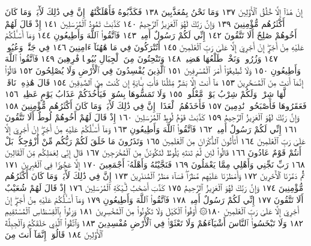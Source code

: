 إِنْ هَٰذَآ إِلَّا خُلُقُ ٱلْأَوَّلِينَ ١٣٧ وَمَا نَحْنُ بِمُعَذَّبِينَ ١٣٨ فَكَذَّبُوهُ
فَأَهْلَكْنَٰهُمْۚ إِنَّ فِي ذَٰلِكَ لَأٓيَةࣰۖ وَمَا كَانَ أَكْثَرُهُم مُّؤْمِنِينَ ١٣٩
وَإِنَّ رَبَّكَ لَهُوَ ٱلْعَزِيزُ ٱلرَّحِيمُ ١٤٠ كَذَّبَتْ ثَمُودُ ٱلْمُرْسَلِينَ ١٤١ إِذْ
قَالَ لَهُمْ أَخُوهُمْ صَٰلِحٌ أَلَا تَتَّقُونَ ١٤٢ إِنِّي لَكُمْ رَسُولٌ أَمِينࣱ ١٤٣
فَٱتَّقُوا۟ ٱللَّهَ وَأَطِيعُونِ ١٤٤ وَمَآ أَسْـَٔلُكُمْ عَلَيْهِ مِنْ أَجْرٍۖ إِنْ أَجْرِيَ
إِلَّا عَلَىٰ رَبِّ ٱلْعَٰلَمِينَ ١٤٥ أَتُتْرَكُونَ فِي مَا هَٰهُنَآ ءَامِنِينَ ١٤٦
فِي جَنَّٰتࣲ وَعُيُونࣲ ١٤٧ وَزُرُوعࣲ وَنَخْلࣲ طَلْعُهَا هَضِيمࣱ ١٤٨
وَتَنْحِتُونَ مِنَ ٱلْجِبَالِ بُيُوتࣰا فَٰرِهِينَ ١٤٩ فَٱتَّقُوا۟ ٱللَّهَ وَأَطِيعُونِ ١٥٠
وَلَا تُطِيعُوٓا۟ أَمْرَ ٱلْمُسْرِفِينَ ١٥١ ٱلَّذِينَ يُفْسِدُونَ فِي ٱلْأَرْضِ
وَلَا يُصْلِحُونَ ١٥٢ قَالُوٓا۟ إِنَّمَآ أَنتَ مِنَ ٱلْمُسَحَّرِينَ ١٥٣ مَآ أَنتَ
إِلَّا بَشَرࣱ مِّثْلُنَا فَأْتِ بِـَٔايَةٍ إِن كُنتَ مِنَ ٱلصَّٰدِقِينَ ١٥٤ قَالَ
هَٰذِهِۦ نَاقَةࣱ لَّهَا شِرْبࣱ وَلَكُمْ شِرْبُ يَوْمࣲ مَّعْلُومࣲ ١٥٥ وَلَا تَمَسُّوهَا
بِسُوٓءࣲ فَيَأْخُذَكُمْ عَذَابُ يَوْمٍ عَظِيمࣲ ١٥٦ فَعَقَرُوهَا فَأَصْبَحُوا۟
نَٰدِمِينَ ١٥٧ فَأَخَذَهُمُ ٱلْعَذَابُۚ إِنَّ فِي ذَٰلِكَ لَأٓيَةࣰۖ وَمَا كَانَ
أَكْثَرُهُم مُّؤْمِنِينَ ١٥٨ وَإِنَّ رَبَّكَ لَهُوَ ٱلْعَزِيزُ ٱلرَّحِيمُ ١٥٩
كَذَّبَتْ قَوْمُ لُوطٍ ٱلْمُرْسَلِينَ ١٦٠ إِذْ قَالَ لَهُمْ أَخُوهُمْ لُوطٌ أَلَا
تَتَّقُونَ ١٦١ إِنِّي لَكُمْ رَسُولٌ أَمِينࣱ ١٦٢ فَٱتَّقُوا۟ ٱللَّهَ وَأَطِيعُونِ ١٦٣ وَمَآ
أَسْـَٔلُكُمْ عَلَيْهِ مِنْ أَجْرٍۖ إِنْ أَجْرِيَ إِلَّا عَلَىٰ رَبِّ ٱلْعَٰلَمِينَ ١٦٤
أَتَأْتُونَ ٱلذُّكْرَانَ مِنَ ٱلْعَٰلَمِينَ ١٦٥ وَتَذَرُونَ مَا خَلَقَ لَكُمْ رَبُّكُم
مِّنْ أَزْوَٰجِكُمۚ بَلْ أَنتُمْ قَوْمٌ عَادُونَ ١٦٦ قَالُوا۟ لَئِن لَّمْ تَنتَهِ يَٰلُوطُ
لَتَكُونَنَّ مِنَ ٱلْمُخْرَجِينَ ١٦٧ قَالَ إِنِّي لِعَمَلِكُم مِّنَ ٱلْقَالِينَ ١٦٨
رَبِّ نَجِّنِي وَأَهْلِي مِمَّا يَعْمَلُونَ ١٦٩ فَنَجَّيْنَٰهُ وَأَهْلَهُۥٓ أَجْمَعِينَ ١٧٠
إِلَّا عَجُوزࣰا فِي ٱلْغَٰبِرِينَ ١٧١ ثُمَّ دَمَّرْنَا ٱلْأٓخَرِينَ ١٧٢ وَأَمْطَرْنَا عَلَيْهِم
مَّطَرࣰاۖ فَسَآءَ مَطَرُ ٱلْمُنذَرِينَ ١٧٣ إِنَّ فِي ذَٰلِكَ لَأٓيَةࣰۖ وَمَا كَانَ أَكْثَرُهُم
مُّؤْمِنِينَ ١٧٤ وَإِنَّ رَبَّكَ لَهُوَ ٱلْعَزِيزُ ٱلرَّحِيمُ ١٧٥ كَذَّبَ أَصْحَٰبُ
لْـَٔيْكَةِ ٱلْمُرْسَلِينَ ١٧٦ إِذْ قَالَ لَهُمْ شُعَيْبٌ أَلَا تَتَّقُونَ ١٧٧ إِنِّي لَكُمْ
رَسُولٌ أَمِينࣱ ١٧٨ فَٱتَّقُوا۟ ٱللَّهَ وَأَطِيعُونِ ١٧٩ وَمَآ أَسْـَٔلُكُمْ عَلَيْهِ
مِنْ أَجْرٍۖ إِنْ أَجْرِيَ إِلَّا عَلَىٰ رَبِّ ٱلْعَٰلَمِينَ ١٨٠۞ أَوْفُوا۟ ٱلْكَيْلَ وَلَا
تَكُونُوا۟ مِنَ ٱلْمُخْسِرِينَ ١٨١ وَزِنُوا۟ بِٱلْقِسْطَاسِ ٱلْمُسْتَقِيمِ ١٨٢
وَلَا تَبْخَسُوا۟ ٱلنَّاسَ أَشْيَآءَهُمْ وَلَا تَعْثَوْا۟ فِي ٱلْأَرْضِ مُفْسِدِينَ ١٨٣
وَٱتَّقُوا۟ ٱلَّذِي خَلَقَكُمْ وَٱلْجِبِلَّةَ ٱلْأَوَّلِينَ ١٨٤ قَالُوٓا۟ إِنَّمَآ أَنتَ مِنَ
